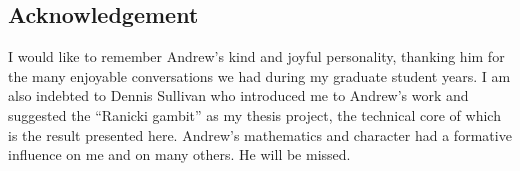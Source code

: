 
\subsection*{Acknowledgement}

I would like to remember Andrew's kind and joyful personality, thanking him for the many enjoyable conversations we had during my graduate student years.
I am also indebted to Dennis Sullivan who introduced me to Andrew's work and suggested the ``Ranicki gambit'' as my thesis project, the technical core of which is the result presented here.
Andrew's mathematics and character had a formative influence on me and on many others.
He will be missed.